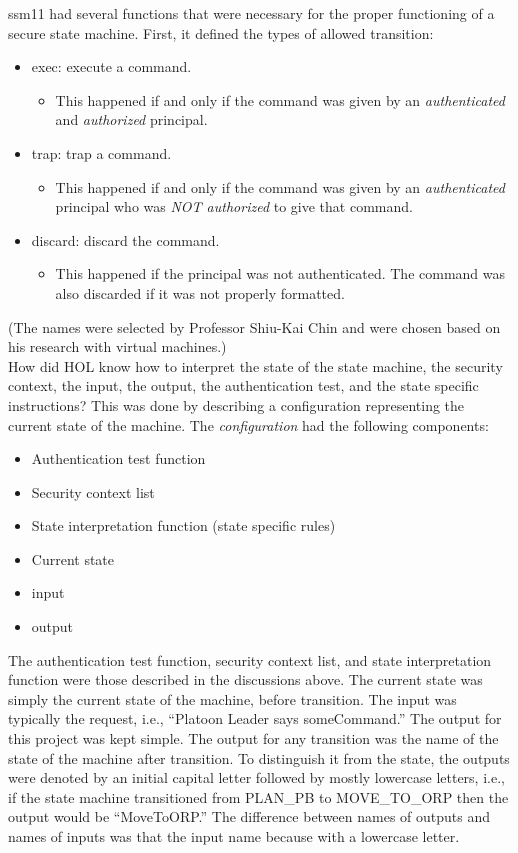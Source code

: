 ssm11 had several functions that were necessary for the proper functioning of a secure state machine.
First, it defined the types of allowed transition:
\begin{itemize}
\item exec: execute a command.
  \begin{itemize}
    \item This happened if and only if the command was given by an \textit{authenticated} and \textit{authorized} principal.
    \end{itemize}
  \item trap: trap a command.
    \begin{itemize}
    \item This happened if and only if the command was given by an \textit{authenticated} principal
      who was \textit{NOT authorized} to give that command.
    \end{itemize}
  \item discard: discard the command.
    \begin{itemize}
    \item This happened if the principal was not authenticated. The command was also discarded
      if it was not properly formatted.
    \end{itemize}
  \end{itemize}
  (The names were selected by Professor Shiu-Kai Chin and were chosen based on his research with
  virtual machines.)\\

  How did HOL know how to interpret the state of the state machine, the security context, the input,
  the output, the authentication test, and the state specific instructions? This was done by describing
  a configuration representing the current state of the machine. The \textit{configuration} had the following
  components:
  \begin{itemize}
  \item Authentication test function
  \item Security context list
  \item State interpretation function (state specific rules)
  \item Current state
  \item input
  \item output
  \end{itemize}
  The authentication test function, security context list, and state interpretation function were
  those described in the discussions above. The current state was simply the current state of the
  machine, before transition. The input was typically the request, i.e., “Platoon Leader says someCommand.”
  The output for this project was kept simple. The output for any transition was the name of the state
  of the machine after transition. To distinguish it from the state, the outputs were denoted by an
  initial capital letter followed by mostly lowercase letters, i.e., if the state machine transitioned
  from PLAN_PB to MOVE_TO_ORP then the output would be “MoveToORP.” The difference between names of
  outputs and names of inputs was that the input name because with a lowercase letter.\\

